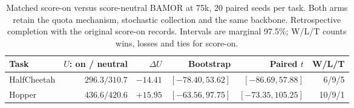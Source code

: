 \begin{table}[!htbp]
\centering\footnotesize
\caption{Matched score-on versus score-neutral BAMOR at 75k, 20 paired seeds per task. Both arms retain the quota mechanism, stochastic collection and the same backbone. Retrospective completion with the original score-on records. Intervals are marginal 97.5\%; W/L/T counts wins, losses and ties for score-on.}
\label{tab:routing75}
\begin{tabular}{@{}lrrrrr@{}}
\toprule
Task & $U$: on / neutral & $\Delta U$ & Bootstrap & Paired $t$ & W/L/T \\
\midrule
HalfCheetah & $296.3/310.7$ & $-14.41$ & ${[-78.40,53.62]}$ & ${[-86.69,57.88]}$ & 6/9/5 \\
Hopper & $436.6/420.6$ & $+15.95$ & ${[-63.56,97.75]}$ & ${[-73.35,105.25]}$ & 10/9/1 \\
\bottomrule
\end{tabular}
\end{table}
